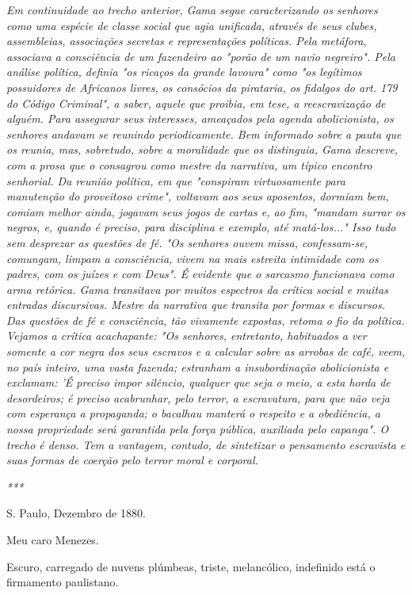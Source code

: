 \emph{Em continuidade ao trecho anterior, Gama segue caracterizando os
senhores como uma espécie de classe social que agia unificada, através
de seus clubes, assembleias, associações secretas e representações
políticas. Pela metáfora, associava a consciência de um fazendeiro ao
"porão de um navio negreiro". Pela análise política, definia "os ricaços
da grande lavoura" como "os legítimos possuidores de Africanos livres,
os consócios da pirataria, os fidalgos do art. 179 do Código Criminal",
a saber, aquele que proibia, em tese, a reescravização de alguém. Para
assegurar seus interesses, ameaçados pela agenda abolicionista, os
senhores andavam se reunindo periodicamente. Bem informado sobre a pauta
que os reunia, mas, sobretudo, sobre a moralidade que os distinguia,
Gama descreve, com a prosa que o consagrou como mestre da narrativa, um
típico encontro senhorial. Da reunião política, em que "conspiram
virtuosamente para manutenção do proveitoso crime", voltavam aos seus
aposentos, dormiam bem, comiam melhor ainda, jogavam seus jogos de
cartas e, ao fim, "mandam surrar os negros, e, quando é preciso, para
disciplina e exemplo, até matá-los..." Isso tudo sem desprezar as
questões de fé. "Os senhores ouvem missa, confessam-se, comungam, limpam
a consciência, vivem na mais estreita intimidade com os padres, com os
juízes e com Deus". É evidente que o sarcasmo funcionava como arma
retórica. Gama transitava por muitos espectros da crítica social e
muitas entradas discursivas. Mestre da narrativa que transita por formas
e discursos. Das questões de fé e consciência, tão vivamente expostas,
retoma o fio da política. Vejamos a crítica acachapante: "Os senhores,
entretanto, habituados a ver somente a cor negra dos seus escravos e a
calcular sobre as arrobas de café, veem, no país inteiro, uma vasta
fazenda; estranham a insubordinação abolicionista e exclamam: 'É preciso
impor silêncio, qualquer que seja o meio, a esta horda de desordeiros; é
preciso acabrunhar, pelo terror, a escravatura, para que não veja com
esperança a propaganda; o bacalhau manterá o respeito e a obediência, a
nossa propriedade será garantida pela força pública, auxiliada pelo
capanga". O trecho é denso. Tem a vantagem, contudo, de sintetizar o
pensamento escravista e suas formas de coerção pelo terror moral e
corporal. }

\emph{***}

S. Paulo, Dezembro de 1880.

Meu caro Menezes.

Escuro, carregado de nuvens plúmbeas, triste, melancólico, indefinido
está o firmamento paulistano.


